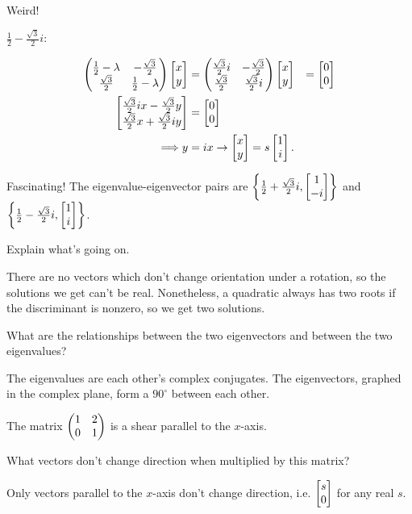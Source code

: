 \documentclass[../gatm_answers.tex]{subfiles}
\begin{document}
Weird!

$\frac{1}{2} - \frac{\sqrt{3}}{2}i:$

\begin{align*}
\begin{pmatrix} \frac{1}{2} - \lambda & -\frac{\sqrt{3}}{2} \\ \frac{\sqrt{3}}{2} & \frac{1}{2} - \lambda \end{pmatrix}\begin{bmatrix} x \\ y \end{bmatrix} &= \begin{pmatrix} \frac{\sqrt{3}}{2}i & -\frac{\sqrt{3}}{2} \\ \frac{\sqrt{3}}{2} & \frac{\sqrt{3}}{2}i \end{pmatrix}\begin{bmatrix} x \\ y \end{bmatrix} &= \begin{bmatrix} 0 \\ 0 \end{bmatrix} \\
\begin{bmatrix} \frac{\sqrt{3}}{2}ix-\frac{\sqrt{3}}{2}y \\ \frac{\sqrt{3}}{2}x+\frac{\sqrt{3}}{2}iy \end{bmatrix} &= \begin{bmatrix} 0 \\ 0 \end{bmatrix} \\
\Longrightarrow y &= ix \rightarrow \begin{bmatrix} x \\ y \end{bmatrix} = s\begin{bmatrix} 1 \\ i \end{bmatrix}.
\end{align*}

Fascinating! The eigenvalue-eigenvector pairs are $\left\{\frac{1}{2} + \frac{\sqrt{3}}{2}i, \begin{bmatrix} 1 \\ -i \end{bmatrix}\right\}$ and $\left\{\frac{1}{2} - \frac{\sqrt{3}}{2}i, \begin{bmatrix} 1 \\ i \end{bmatrix}\right\}$.

\begin{inner_problem}
\item Explain what's going on.
\end{inner_problem}

There are no vectors which don't change orientation under a rotation, so the solutions we get can't be real. Nonetheless, a quadratic always has two roots if the discriminant is nonzero, so we get two solutions.

\begin{inner_problem}
\item What are the relationships between the two eigenvectors and between the two eigenvalues?
\end{inner_problem}

The eigenvalues are each other's complex conjugates. The eigenvectors, graphed in the complex plane, form a $90^\circ$ between each other.

\begin{outer_problem}
\item The matrix $\begin{pmatrix} 1 & 2 \\ 0 & 1 \end{pmatrix}$ is a shear parallel to the $x$-axis.
\end{outer_problem}

\begin{inner_problem}[start=1]
\item What vectors don't change direction when multiplied by this matrix?
\end{inner_problem}

Only vectors parallel to the $x$-axis don't change direction, i.e. $\begin{bmatrix} s \\ 0 \end{bmatrix}$ for any real $s$.
\end{document}
